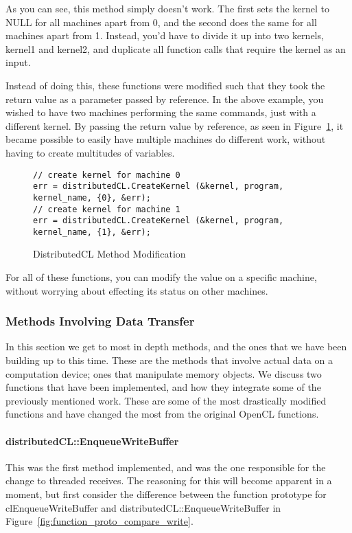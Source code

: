 \documentclass[../thesis.tex]{subfiles}
\begin{document}
        As you can see, this method simply doesn't work. The first sets the kernel to NULL for all machines apart from 0, and the second does the same for all machines apart from 1. Instead, you'd have to divide it up into two kernels, kernel1 and kernel2, and duplicate all function calls that require the kernel as an input.

        Instead of doing this, these functions were modified such that they took the return value as a parameter passed by reference. In the above example, you wished to have two machines performing the same commands, just with a different kernel. By passing the return value by reference, as seen in Figure~\ref{fig:kernel_reference}, it became possible to easily have multiple machines do different work, without having to create multitudes of variables.

        \begin{figure}[htbp]
            \centering
                \lstset{language=cpp}
                \begin{lstlisting}[tabsize=2]
// create kernel for machine 0
err = distributedCL.CreateKernel (&kernel, program, kernel_name, {0}, &err);
// create kernel for machine 1
err = distributedCL.CreateKernel (&kernel, program, kernel_name, {1}, &err);
                \end{lstlisting}
            \caption{DistributedCL Method Modification}
            \label{fig:kernel_reference}
        \end{figure}

        For all of these functions, you can modify the value on a specific machine, without worrying about effecting its status on other machines.

    \subsubsection{Methods Involving Data Transfer} %
    \label{ssub:methods_involving_data_transfer}
        In this section we get to most in depth methods, and the ones that we have been building up to this time. These are the methods that involve actual data on a computation device; ones that manipulate memory objects. We discuss two functions that have been implemented, and how they integrate some of the previously mentioned work. These are some of the most drastically modified functions and have changed the most from the original OpenCL functions.

        \paragraph{distributedCL::EnqueueWriteBuffer} %
        \label{par:clenqueuewritebuffer}
            This was the first method implemented, and was the one responsible for the change to threaded receives. The reasoning for this will become apparent in a moment, but first consider the difference between the function prototype for clEnqueueWriteBuffer and distributedCL::EnqueueWriteBuffer in Figure~\ref{fig:function_proto_compare_write}.
\end{document}
